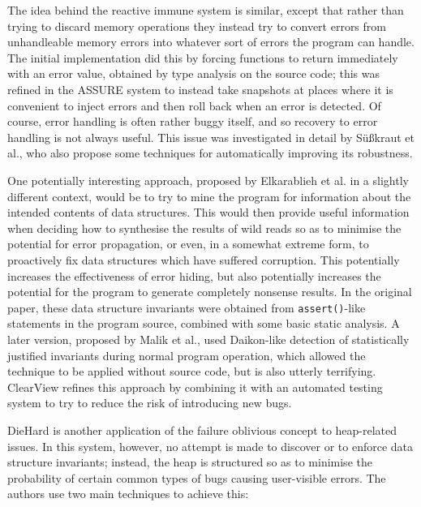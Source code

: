 The idea behind the reactive immune system\cite{Sidiroglou2005} is
similar, except that rather than trying to discard memory operations
they instead try to convert errors from unhandleable memory errors
into whatever sort of errors the program can handle.  The initial
implementation did this by forcing functions to return immediately
with an error value, obtained by type analysis on the source code;
this was refined in the ASSURE system\cite{Sidiroglou2009} to instead
take snapshots at places where it is convenient to inject errors and
then roll back when an error is detected.  Of course, error handling
is often rather buggy itself, and so recovery to error handling is not
always useful.  This issue was investigated in detail by
S\"{u}\ss{}kraut et al.\cite{Susskraut2006}, who also propose some
techniques for automatically improving its robustness.

One potentially interesting approach, proposed by Elkarablieh et
al.\cite{Elkarablieh2007} in a slightly different context, would be to
try to mine the program for information about the intended contents of
data structures.  This would then provide useful information when
deciding how to synthesise the results of wild reads so as to minimise
the potential for error propagation, or even, in a somewhat extreme
form, to proactively fix data structures which have suffered
corruption.  This potentially increases the effectiveness of error
hiding, but also potentially increases the potential for the program
to generate completely nonsense results.  In the original paper, these
data structure invariants were obtained from \verb|assert()|-like
statements in the program source, combined with some basic static
analysis.  A later version, proposed by Malik et al.\cite{Malik}, used
Daikon-like detection of statistically justified invariants during
normal program operation, which allowed the technique to be applied
without source code, but is also utterly
terrifying.  ClearView\cite{Perkins} refines
this approach by combining it with an automated testing system to try
to reduce the risk of introducing new bugs.

DieHard\cite{Berger2006} is another application of the failure
oblivious concept to heap-related issues.  In this system, however, no
attempt is made to discover or to enforce data structure invariants;
instead, the heap is structured so as to minimise the probability of
certain common types of bugs causing user-visible errors.  The authors
use two main techniques to achieve this:

